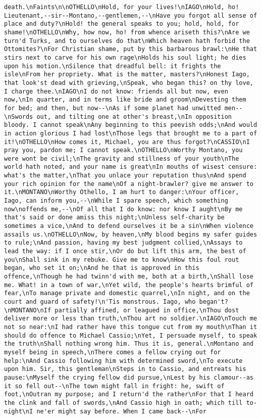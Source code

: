 \begin{verbatim}
death.\nFaints\n\nOTHELLO\nHold, for your lives!\nIAGO\nHold, ho! Lieutenant,--sir--Montano,--gentlemen,--\nHave you forgot all sense of place and duty?\nHold! the general speaks to you; hold, hold, for shame!\nOTHELLO\nWhy, how now, ho! from whence ariseth this?\nAre we turn'd Turks, and to ourselves do that\nWhich heaven hath forbid the Ottomites?\nFor Christian shame, put by this barbarous brawl:\nHe that stirs next to carve for his own rage\nHolds his soul light; he dies upon his motion.\nSilence that dreadful bell: it frights the isle\nFrom her propriety. What is the matter, masters?\nHonest Iago, that look'st dead with grieving,\nSpeak, who began this? on thy love, I charge thee.\nIAGO\nI do not know: friends all but now, even now,\nIn quarter, and in terms like bride and groom\nDevesting them for bed; and then, but now--\nAs if some planet had unwitted men--\nSwords out, and tilting one at other's breast,\nIn opposition bloody. I cannot speak\nAny beginning to this peevish odds;\nAnd would in action glorious I had lost\nThose legs that brought me to a part of it!\nOTHELLO\nHow comes it, Michael, you are thus forgot?\nCASSIO\nI pray you, pardon me; I cannot speak.\nOTHELLO\nWorthy Montano, you were wont be civil;\nThe gravity and stillness of your youth\nThe world hath noted, and your name is great\nIn mouths of wisest censure: what's the matter,\nThat you unlace your reputation thus\nAnd spend your rich opinion for the name\nOf a night-brawler? give me answer to it.\nMONTANO\nWorthy Othello, I am hurt to danger:\nYour officer, Iago, can inform you,--\nWhile I spare speech, which something now\noffends me,--\nOf all that I do know: nor know I aught\nBy me that's said or done amiss this night;\nUnless self-charity be sometimes a vice,\nAnd to defend ourselves it be a sin\nWhen violence assails us.\nOTHELLO\nNow, by heaven,\nMy blood begins my safer guides to rule;\nAnd passion, having my best judgment collied,\nAssays to lead the way: if I once stir,\nOr do but lift this arm, the best of you\nShall sink in my rebuke. Give me to know\nHow this foul rout began, who set it on;\nAnd he that is approved in this offence,\nThough he had twinn'd with me, both at a birth,\nShall lose me. What! in a town of war,\nYet wild, the people's hearts brimful of fear,\nTo manage private and domestic quarrel,\nIn night, and on the court and guard of safety!\n'Tis monstrous. Iago, who began't?\nMONTANO\nIf partially affined, or leagued in office,\nThou dost deliver more or less than truth,\nThou art no soldier.\nIAGO\nTouch me not so near:\nI had rather have this tongue cut from my mouth\nThan it should do offence to Michael Cassio;\nYet, I persuade myself, to speak the truth\nShall nothing wrong him. Thus it is, general.\nMontano and myself being in speech,\nThere comes a fellow crying out for help:\nAnd Cassio following him with determined sword,\nTo execute upon him. Sir, this gentleman\nSteps in to Cassio, and entreats his pause:\nMyself the crying fellow did pursue,\nLest by his clamour--as it so fell out--\nThe town might fall in fright: he, swift of foot,\nOutran my purpose; and I return'd the rather\nFor that I heard the clink and fall of swords,\nAnd Cassio high in oath; which till to-night\nI ne'er might say before. When I came back--\nFor 
\end{verbatim}
